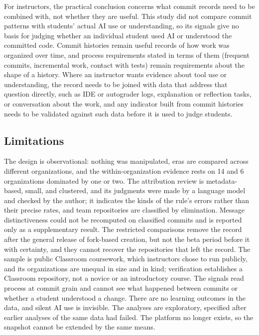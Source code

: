 \documentclass[acmsmall,screen,review,anonymous]{acmart}
\begin{document}
For instructors, the practical conclusion concerns what commit records need to be combined with, not whether they are useful. This study did not compare commit patterns with students' actual AI use or understanding, so its signals give no basis for judging whether an individual student used AI or understood the committed code. Commit histories remain useful records of how work was organized over time, and process requirements stated in terms of them (frequent commits, incremental work, contact with tests) remain requirements about the shape of a history. Where an instructor wants evidence about tool use or understanding, the record needs to be joined with data that address that question directly, such as IDE or autograder logs, explanation or reflection tasks, or conversation about the work, and any indicator built from commit histories needs to be validated against such data before it is used to judge students.

\subsection{Limitations}
\label{sec:limitations}

The design is observational: nothing was manipulated, eras are compared across different organizations, and the within-organization evidence rests on 14 and 6 organizations dominated by one or two. The attribution review is metadata-based, small, and clustered, and its judgments were made by a language model and checked by the author; it indicates the kinds of the rule's errors rather than their precise rates, and team repositories are classified by elimination. Message distinctiveness could not be recomputed on classified commits and is reported only as a supplementary result. The restricted comparisons remove the record after the general release of fork-based creation, but not the beta period before it with certainty, and they cannot recover the repositories that left the record. The sample is public Classroom coursework, which instructors chose to run publicly, and its organizations are unequal in size and in kind; verification establishes a Classroom repository, not a novice or an introductory course. The signals read process at commit grain and cannot see what happened between commits or whether a student understood a change. There are no learning outcomes in the data, and silent AI use is invisible. The analyses are exploratory, specified after earlier analyses of the same data had failed. The platform no longer exists, so the snapshot cannot be extended by the same means.
\end{document}

